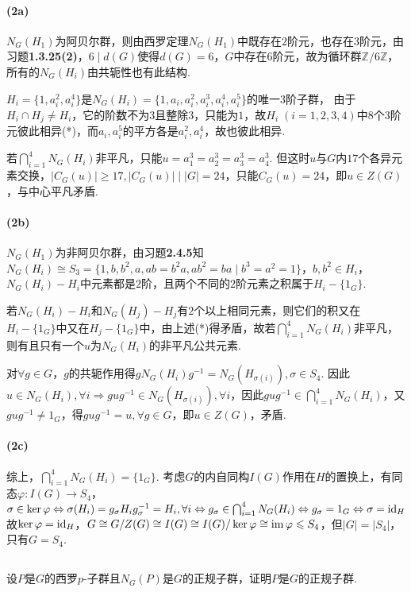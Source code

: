 {	\paragraph{(2a)}
	
	$N_G(H_1)$为阿贝尔群，则由西罗定理$N_G(H_1)$中既存在$2$阶元，也存在$3$阶元，由{\heiti 习题}\textbf{1.3.25(2)}，$6\mid d(G)$使得$d(G)=6$，$G$中存在$6$阶元，故为循环群$\mathbb{Z}/6\mathbb{Z}$，所有的$N_G(H_i)$由共轭性也有此结构.
	
	$H_i=\{1,a_i^2,a_i^4\}$是$N_G(H_i)=\{1,a_i,a_i^2,a_i^3,a_i^4,a_i^5\}$的唯一$3$阶子群，
	由于$H_i\cap H_j\neq H_i$，它的阶数不为$3$且整除$3$，只能为$1$，故$H_i\;(i=1,2,3,4)$中$8$个$3$阶元彼此相异(*)，而$a_i, a_i^5$的平方各是$a_i^2,a_i^4$，故也彼此相异. 
	
	若$\bigcap_{i=1}^4N_G(H_i)$非平凡，只能$u=a_1^3=a_2^3=a_3^3=a_4^3$. 但这时$u$与$G$内$17$个各异元素交换，$|C_G(u)|\geq 17, |C_G(u)|\mid |G|=24$，只能$C_G(u)=24$，即$u\in Z(G)$，与中心平凡矛盾.
	 
	 \paragraph{(2b)}
	 
	 $N_G(H_1)$为非阿贝尔群，由{\heiti 习题}\textbf{2.4.5}知$N_G(H_i)\cong S_3=\{1,b,b^2,a,ab=b^2a,ab^2=ba\mid b^3=a^2=1\}$，$b,b^2\in H_i$，$N_G(H_i)-H_i$中元素都是$2$阶，且两个不同的$2$阶元素之积属于$H_i-\{1_G\}$.
	 
	 若$N_G(H_i)-H_i$和$N_G(H_j)-H_j$有$2$个以上相同元素，则它们的积又在$H_i-\{1_G\}$中又在$H_j-\{1_G\}$中，由上述(*)得矛盾，故若$\bigcap_{i=1}^4N_G(H_i)$非平凡，则有且只有一个$u$为$N_G(H_i)$的非平凡公共元素.
	 
	 对$\forall g\in G$，$g$的共轭作用得$gN_G(H_i)g^{-1}=N_G(H_{\sigma(i)}), \sigma\in S_4$. 因此$u\in N_G(H_i),\forall i\Rightarrow gug^{-1}\in N_G(H_{\sigma(i)}),\forall i$，因此$gug^{-1}\in\bigcap_{i=1}^4N_G(H_i)$，又$gug^{-1}\neq 1_G$，得$gug^{-1}=u, \forall g\in G$，即$u\in Z(G)$，矛盾.
	 
	 \paragraph{(2c)}
	 综上，$\bigcap_{i=1}^4N_G(H_i)=\{1_G\}$. 考虑$G$的内自同构$I(G)$作用在$H$的置换上，有同态$\varphi: I(G)\rightarrow S_4$，$\sigma \in \ker\varphi \Leftrightarrow \sigma(H_i)=g_{\sigma}H_ig_{\sigma}^{-1}=H_i,  \forall i\Leftrightarrow g_{\sigma}\in \bigcap_{i=1}^4N_G(H_i)\Leftrightarrow g_{\sigma}=1_G\Leftrightarrow \sigma=\operatorname{id}_H$
	 故$\ker\varphi=\operatorname{id}_H$，$G\cong G/Z(G)\cong I(G)\cong I(G)/\ker\varphi\cong \operatorname{im}\varphi\leqslant S_4$，但$|G|=|S_4|$，只有$G=S_4$.
}

\subsection{}
设$P$是$G$的西罗$p$-子群且$N_G(P)$是$G$的正规子群，证明$P$是$G$的正规子群.

